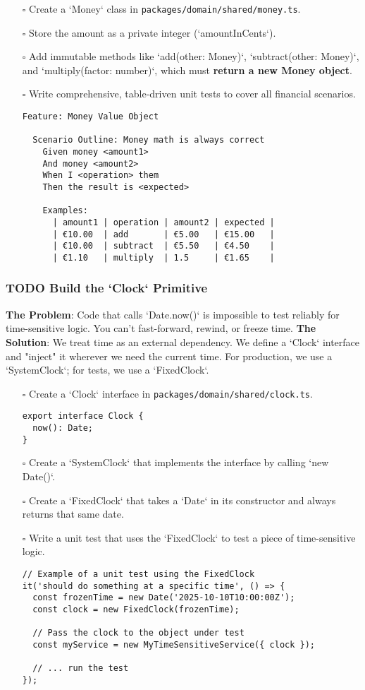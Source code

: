 \documentclass[11pt]{article}
\begin{document}
\begin{itemize}
\item[{$\square$}] Create a `Money` class in \texttt{packages/domain/shared/money.ts}.
\item[{$\square$}] Store the amount as a private integer (`amountInCents`).
\item[{$\square$}] Add immutable methods like `add(other: Money)`, `subtract(other: Money)`, and `multiply(factor: number)`, which must \textbf{return a new Money object}.
\item[{$\square$}] Write comprehensive, table-driven unit tests to cover all financial scenarios.
\begin{verbatim}
Feature: Money Value Object

  Scenario Outline: Money math is always correct
    Given money <amount1>
    And money <amount2>
    When I <operation> them
    Then the result is <expected>

    Examples:
      | amount1 | operation | amount2 | expected |
      | €10.00  | add       | €5.00   | €15.00   |
      | €10.00  | subtract  | €5.50   | €4.50    |
      | €1.10   | multiply  | 1.5     | €1.65    |
\end{verbatim}
\end{itemize}
\subsubsection{{\bfseries\sffamily TODO} Build the `Clock` Primitive}
\label{sec:org813e5f9}
\textbf{The Problem}: Code that calls `Date.now()` is impossible to test reliably for time-sensitive logic. You can't fast-forward, rewind, or freeze time.
\textbf{The Solution}: We treat time as an external dependency. We define a `Clock` interface and "inject" it wherever we need the current time. For production, we use a `SystemClock`; for tests, we use a `FixedClock`.

\begin{itemize}
\item[{$\square$}] Create a `Clock` interface in \texttt{packages/domain/shared/clock.ts}.
\begin{verbatim}
export interface Clock {
  now(): Date;
}
\end{verbatim}
\item[{$\square$}] Create a `SystemClock` that implements the interface by calling `new Date()`.
\item[{$\square$}] Create a `FixedClock` that takes a `Date` in its constructor and always returns that same date.
\item[{$\square$}] Write a unit test that uses the `FixedClock` to test a piece of time-sensitive logic.
\begin{verbatim}
// Example of a unit test using the FixedClock
it('should do something at a specific time', () => {
  const frozenTime = new Date('2025-10-10T10:00:00Z');
  const clock = new FixedClock(frozenTime);

  // Pass the clock to the object under test
  const myService = new MyTimeSensitiveService({ clock });

  // ... run the test
});
\end{verbatim}
\end{itemize}
\end{document}
